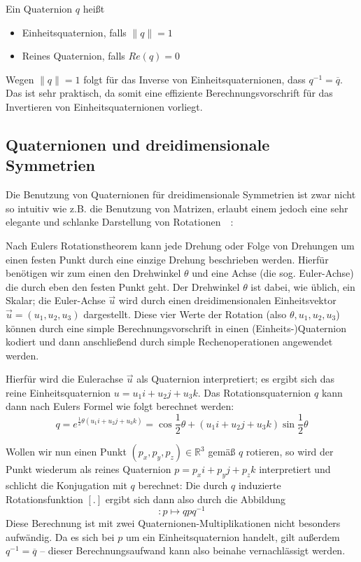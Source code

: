\begin{definition}
Ein Quaternion $q$ heißt 
\begin{itemize}
\item Einheitsquaternion, falls $\|q\| = 1$
\item Reines Quaternion, falls $Re(q) = 0$
\end{itemize}\vspace{-0.9cm}
\end{definition}
Wegen $\|q\| = 1$ folgt für das Inverse von Einheitsquaternionen, dass $q^{-1} = \overline{q}$. Das ist sehr praktisch,
da somit eine effiziente Berechnungsvorschrift für das Invertieren von Einheitsquaternionen vorliegt.

\subsection{Quaternionen und dreidimensionale Symmetrien\label{ssec:quad3sym}}
Die Benutzung von Quaternionen für dreidimensionale Symmetrien ist zwar nicht so intuitiv wie z.B. die Benutzung von Matrizen,
erlaubt einem jedoch eine sehr elegante und schlanke Darstellung von Rotationen~\cite{conway2003}~\cite{du1964}: 

Nach Eulers Rotationstheorem kann jede Drehung oder Folge von Drehungen um einen festen Punkt durch eine einzige Drehung beschrieben werden.
Hierfür benötigen wir zum einen den Drehwinkel $\theta$ und eine Achse (die sog. Euler-Achse) die durch eben den festen Punkt geht.
Der Drehwinkel $\theta$ ist dabei, wie üblich, ein Skalar; die Euler-Achse $\overrightarrow{u}$ wird durch einen dreidimensionalen Einheitsvektor $\overrightarrow{u} = (u_1,u_2,u_3)$ dargestellt. Diese vier Werte der Rotation (also $\theta, u_1, u_2, u_3$) können durch eine simple
Berechnungsvorschrift in einen (Einheits-)Quaternion kodiert und dann anschließend durch simple Rechenoperationen
angewendet werden.

Hierfür wird die Eulerachse $\overrightarrow{u}$ als Quaternion interpretiert; es ergibt sich das reine Einheitsquaternion
$u = u_1 i + u_2 j + u_3 k$. Das Rotationsquaternion $q$ kann dann nach Eulers Formel wie folgt berechnet werden:
\begin{equation*}
q = e^{\frac{1}{2} \theta \left( u_1 i + u_2 j + u_3 k \right)} = \cos \frac{1}{2} \theta + \left( u_1 i + u_2 j + u_3 k \right) \sin \frac{1}{2} \theta
\end{equation*}

\noindent Wollen wir nun einen Punkt $(p_x, p_y, p_z) \in \mathbb{R}^3$ gemäß $q$ rotieren, so wird der Punkt wiederum als reines Quaternion
$p = p_x i + p_y j + p_z k$ interpretiert und schlicht die Konjugation mit $q$ berechnet:
Die durch $q$ induzierte Rotationsfunktion $[.]$ ergibt sich dann also durch die Abbildung
\begin{equation*}
[q]: p \mapsto q p q^{-1}
\end{equation*}
Diese Berechnung ist mit zwei Quaternionen-Multiplikationen nicht besonders aufwändig.
Da es sich bei $p$ um ein Einheitsquaternion handelt, gilt außerdem $q^{-1} = \overline{q}$ -- dieser Berechnungsaufwand
kann also beinahe vernachlässigt werden. \\

